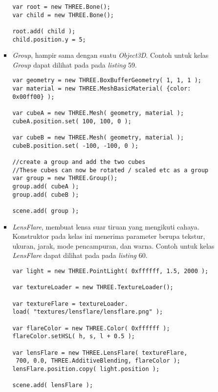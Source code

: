 \documentclass[a4paper,twoside]{article}
\begin{document}
\begin{enumerate}
\begin{itemize}
\begin{itemize}
\begin{lstlisting}[caption={Contoh penggunaan kelas {\it Bone}.},captionpos=b]
var root = new THREE.Bone();
var child = new THREE.Bone();

root.add( child );
child.position.y = 5;
\end{lstlisting}
	
	\item {\it Group}, hampir sama dengan suatu {\it Object3D}. Contoh untuk kelas {\it Group} dapat dilihat pada pada {\it listing} 59.
	
\begin{lstlisting}[caption={Contoh penggunaan kelas {\it Group}.},captionpos=b]
var geometry = new THREE.BoxBufferGeometry( 1, 1, 1 );
var material = new THREE.MeshBasicMaterial( {color: 0x00ff00} );

var cubeA = new THREE.Mesh( geometry, material );
cubeA.position.set( 100, 100, 0 );

var cubeB = new THREE.Mesh( geometry, material );
cubeB.position.set( -100, -100, 0 );

//create a group and add the two cubes
//These cubes can now be rotated / scaled etc as a group
var group = new THREE.Group();
group.add( cubeA );
group.add( cubeB );

scene.add( group );
\end{lstlisting}
	
	\item {\it LensFlare}, membuat lensa suar tiruan yang mengikuti cahaya. Konstruktor pada kelas ini menerima parameter berupa tekstur, ukuran, jarak, mode pencampuran, dan warna. Contoh untuk kelas {\it LensFlare} dapat dilihat pada pada {\it listing} 60.
	
\begin{lstlisting}[caption={Contoh penggunaan kelas {\it LensFlare}.},captionpos=b]
var light = new THREE.PointLight( 0xffffff, 1.5, 2000 );

var textureLoader = new THREE.TextureLoader();

var textureFlare = textureLoader.
load( "textures/lensflare/lensflare.png" );

var flareColor = new THREE.Color( 0xffffff );
flareColor.setHSL( h, s, l + 0.5 );

var lensFlare = new THREE.LensFlare( textureFlare,
 700, 0.0, THREE.AdditiveBlending, flareColor );
lensFlare.position.copy( light.position );

scene.add( lensFlare );
\end{lstlisting}
	

\end{itemize}
\end{itemize}
\end{enumerate}
\end{document}
